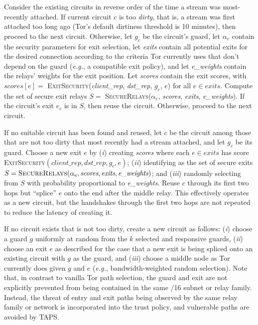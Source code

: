 \documentclass[conference]{styles/IEEEtran}
\newcommand{\eg}{\emph{e.g.}}
\newcommand{\ps}{TAPS\xspace}
\begin{document}
Consider the existing circuits in reverse order of the time a stream was most-recently
attached. If current circuit $c$ is too \textit{dirty}, that is, a stream was first attached too
long ago (Tor's default dirtiness threshold is 10 minutes), then proceed to the next circuit.
Otherwise, let
$g_c$ be the circuit's guard, let $\alpha_e$ contain the security parameters for exit
selection, let \textit{exits} contain all potential exits for the desired connection according to
the criteria Tor currently uses that don't depend on the guard (\eg{}, a compatible exit policy),
and let \textit{e\_weights} contain the relays' weights for the exit position. Let
\textit{scores} contain
the exit scores, with $\textit{scores}[e] =$ \textsc{ExitSecurity}(\textit{client\_rep},
\textit{dst\_rep}, $g_c$, $e$) for all $e\in \textit{exits}$. Compute the set of secure exit relays
$S = $ \textsc{SecureRelays}($\alpha_e$, \textit{scores}, \textit{exits}, \textit{e\_weights}).
If the circuit's exit $e_c$ is in $S$, then reuse the circuit. Otherwise, proceed to the next
circuit.

If no suitable circuit has been found and reused, let $c$ be the circuit among those that are
not too dirty that most recently had a stream attached, and let $g_c$ be its guard. Choose a
new exit $e$ by (\emph{i}) creating \textit{scores} where each $e\in\textit{exits}$ has score
\textsc{ExitSecurity}$(\textit{client\_rep}, \textit{dst\_rep}, g_c, e)$; (\emph{ii})
identifying as the set of secure exits
$S = \textsc{SecureRelays}(\alpha_e, \textit{scores}, \textit{exits}, \textit{e\_weights})$; and
(\emph{iii}) randomly selecting from $S$ with probability proportional to \textit{e\_weights}.
Reuse $c$ through its first two hops but ``splice'' $e$ onto the end after the middle relay.
This effectively operates as a new circuit, but the handshakes through the first two
hops are not repeated to reduce the latency of creating it.

If no circuit exists that is not too dirty, create a new circuit as follows: (\emph{i})
choose a guard $g$ uniformly at random from the $k$ selected and responsive guards, (\emph{ii})
choose an exit $e$ as described for the case that a new exit is being spliced onto an existing
circuit with $g$ as the guard,
and (\emph{iii})
choose a middle node as Tor currently does given $g$ and $e$ (\eg{}, bandwidth-weighted random
selection).  Note that, in contrast
to vanilla Tor path selection, the guard and exit are not explicitly prevented from being contained
in the same /16 subnet or relay family. Instead, the threat of entry and exit paths being observed
by the same relay family or network is incorporated into the trust policy, and vulnerable paths are
avoided by \ps.
\end{document}
